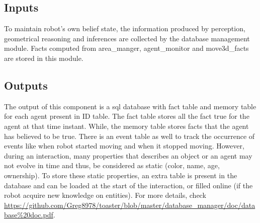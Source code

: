 \documentclass[a4paper]{article}
\begin{document}
\subsection{Inputs}
To maintain robot's own belief state, the information produced by perception, geometrical reasoning and inferences are collected by the database management module. Facts computed from area\_manger, agent\_monitor and move3d\_facts are stored in this module. 
\subsection{Outputs}
The output of this component is a sql database with fact table and memory table for each agent present in ID table. The fact table stores all the fact true for the agent at that time instant. While, the memory table stores facts that the agent has believed to be true. There is an event table as well to track the occurrence of events like when robot started moving and when it stopped moving. However, during an interaction, many properties that describes an object or an agent may not evolve in time and thus, be considered as static (color, name, age, ownership). To store these static properties, an extra table is present in the database and can be loaded at the start of the interaction, or filled online (if the robot acquire new knowledge on entities). For more details, check \url{https://github.com/Greg8978/toaster/blob/master/database\_manager/doc/database\%20doc.pdf}.
\end{document}
